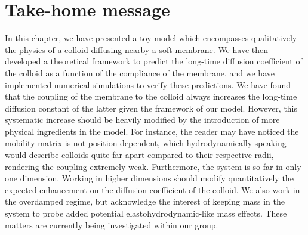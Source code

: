\section{Take-home message}

In this chapter, we have presented a toy model which encompasses qualitatively the physics of a colloid diffusing nearby a soft membrane. We have then developed a theoretical framework to predict the long-time diffusion coefficient of the colloid as a function of the compliance of the membrane, and we have implemented numerical simulations to verify these predictions. We have found that the coupling of the membrane to the colloid always increases the long-time diffusion constant of the latter given the framework of our model. However, this systematic increase should be heavily modified by the introduction of more physical ingredients in the model. For instance, the reader may have noticed the mobility matrix is not position-dependent, which hydrodynamically speaking would describe colloids quite far apart compared to their respective radii, rendering the coupling extremely weak. Furthermore, the system is so far in only one dimension. Working in higher dimensions should modify quantitatively the expected enhancement on the diffusion coefficient of the colloid. We also work in the overdamped regime, but acknowledge the interest of keeping mass in the system to probe added potential elastohydrodynamic-like mass effects. These matters are currently being investigated within our group.